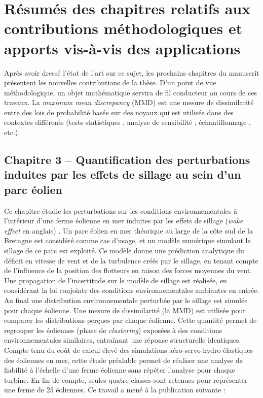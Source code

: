 \section*{Résumés des chapitres relatifs aux contributions méthodologiques et apports vis-à-vis des applications}

Après avoir dressé l'état de l'art sur ce sujet, les prochains chapitres du manuscrit présentent les nouvelles contributions de la thèse. 
D'un point de vue méthodologique, un objet mathématique servira de fil conducteur au cours de ces travaux. 
La \textit{maximum mean discrepancy} (MMD) \cite{oates_21} est une mesure de dissimilarité entre des lois de probabilité basée sur des noyaux qui est utilisée dans des contextes différents (tests statistiques \cite{gretton_2006}, analyse de sensibilité \cite{daveiga_2015}, échantillonnage \cite{pronzato_zhigljavsky_2020}, etc.).

\subsection*{Chapitre 3 -- Quantification des perturbations induites par les effets de sillage au sein d'un parc éolien}

Ce chapitre étudie les perturbations sur les conditions environnementales à l'intérieur d'une ferme éolienne en mer induites par les effets de sillage (\textit{wake effect} en anglais) \cite{larsen_2008_wake}. 
Un parc éolien en mer théorique au large de la côte sud de la Bretagne est considéré comme cas d'usage, et un modèle numérique simulant le sillage de ce parc est exploité. 
Ce modèle donne une prédiction analytique du déficit en vitesse de vent et de la turbulence créés par le sillage, en tenant compte de l'influence de la position des flotteurs en raison des forces moyennes du vent. 
Une propagation de l'incertitude sur le modèle de sillage est réalisée, en considérant la loi conjointe des conditions environnementales ambiantes en entrée. 
Au final une distribution environnementale perturbée par le sillage est simulée pour chaque éolienne. 
Une mesure de dissimilarité (la MMD) est utilisée pour comparer les distributions perçues par chaque éolienne. 
Cette quantité permet de regrouper les éoliennes (phase de \textit{clustering}) exposées à des conditions environnementales similaires, entraînant une réponse structurelle identiques. 
Compte tenu du coût de calcul élevé des simulations aéro-servo-hydro-élastiques des éoliennes en mer, cette étude préalable permet de réaliser une analyse de fiabilité à l'échelle d'une ferme éolienne sans répéter l'analyse pour chaque turbine. 
En fin de compte, seules quatre classes sont retenues pour représenter une ferme de 25 éoliennes. 
Ce travail a mené à la publication suivante : \\

